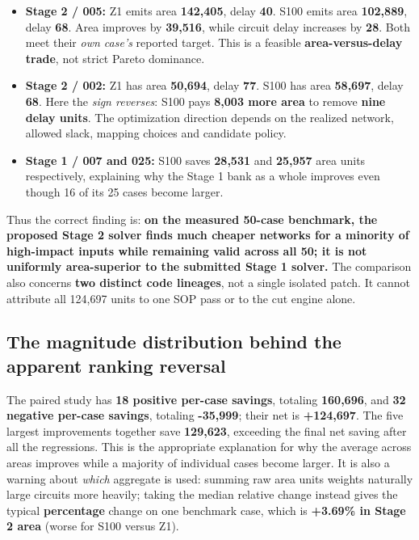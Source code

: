 \begin{itemize}
\tightlist
\item
  \textbf{Stage 2 / 005:} Z1 emits area \textbf{142,405}, delay \textbf{40}. S100 emits area \textbf{102,889}, delay \textbf{68}. Area improves by \textbf{39,516}, while circuit delay increases by \textbf{28}. Both meet their \emph{own case's} reported target. This is a feasible \textbf{area-versus-delay trade}, not strict Pareto dominance.
\item
  \textbf{Stage 2 / 002:} Z1 has area \textbf{50,694}, delay \textbf{77}. S100 has area \textbf{58,697}, delay \textbf{68}. Here the \emph{sign reverses}: S100 pays \textbf{8,003 more area} to remove \textbf{nine delay units}. The optimization direction depends on the realized network, allowed slack, mapping choices and candidate policy.
\item
  \textbf{Stage 1 / 007 and 025:} S100 saves \textbf{28,531} and \textbf{25,957} area units respectively, explaining why the Stage 1 bank as a whole improves even though 16 of its 25 cases become larger.
\end{itemize}

Thus the correct finding is: \textbf{on the measured 50-case benchmark, the proposed Stage 2 solver finds much cheaper networks for a minority of high-impact inputs while remaining valid across all 50; it is not uniformly area-superior to the submitted Stage 1 solver.} The comparison also concerns \textbf{two distinct code lineages}, not a single isolated patch. It cannot attribute all 124,697 units to one SOP pass or to the cut engine alone.

\subsection{The magnitude distribution behind the apparent ranking reversal}\label{a-the-magnitude-distribution-behind-the-apparent-ranking-reversal}

The paired study has \textbf{18 positive per-case savings}, totaling \textbf{160,696}, and \textbf{32 negative per-case savings}, totaling \textbf{-35,999}; their net is \textbf{+124,697}. The five largest improvements together save \textbf{129,623}, exceeding the final net saving after all the regressions. This is the appropriate explanation for why the average across areas improves while a majority of individual cases become larger. It is also a warning about \emph{which} aggregate is used: summing raw area units weights naturally large circuits more heavily; taking the median relative change instead gives the typical \textbf{percentage} change on one benchmark case, which is \textbf{+3.69\% in Stage 2 area} (worse for S100 versus Z1).

